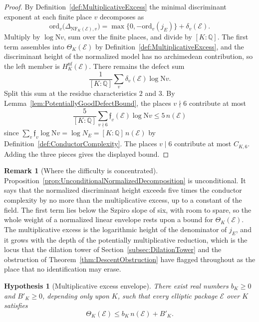 \documentclass[10pt, reqno]{amsart}
\theoremstyle{plain}
\theoremstyle{definition}
\newtheorem{remark}[theorem]{Remark}
\theoremstyle{plain}
\newtheorem{hypothesis}[theorem]{Hypothesis}
\newcommand{\Q}{\mathbb{Q}}
\begin{document}
\begin{proof}
By Definition~\ref{def:MultiplicativeExcess} the minimal discriminant exponent at each finite place $v$ decomposes as
\[
  \mathrm{ord}_{v}\bigl(\Delta_{\mathrm{NF}_{K}(\mathcal{E}),v}\bigr)
  =
  \max\bigl\{0,-\mathrm{ord}_{v}(j_{E})\bigr\}+\delta_{v}(\mathcal{E}).
\]
Multiply by $\log\mathrm{N}v$, sum over the finite places, and divide by $[K:\Q]$. The first term assembles into $\Theta_{K}(\mathcal{E})$ by Definition~\ref{def:MultiplicativeExcess}, and the discriminant height of the normalized model has no archimedean contribution, so the left member is $H^{\mathrm{nf}}_{K}(\mathcal{E})$. There remains the defect sum
\[
  \frac{1}{[K:\Q]}\sum_{v}\delta_{v}(\mathcal{E})\log\mathrm{N}v.
\]
Split this sum at the residue characteristics $2$ and $3$. By Lemma~\ref{lem:PotentiallyGoodDefectBound}, the places $v\nmid 6$ contribute at most
\[
  \frac{5}{[K:\Q]}\sum_{v\nmid 6}\mathfrak{f}_{v}(\mathcal{E})\log\mathrm{N}v
  \le
  5\,n(\mathcal{E})
\]
since $\sum_{v}\mathfrak{f}_{v}\log\mathrm{N}v=\log N_{E}=[K:\Q]\,n(\mathcal{E})$ by Definition~\ref{def:ConductorComplexity}. The places $v\mid 6$ contribute at most $C_{K,6}$. Adding the three pieces gives the displayed bound.
\end{proof}

\begin{remark}[Where the difficulty is concentrated]
\label{rem:LocalizationOfDifficulty}
Proposition~\ref{prop:UnconditionalNormalizedDecomposition} is unconditional. It says that the normalized discriminant height exceeds five times the conductor complexity by no more than the multiplicative excess, up to a constant of the field. The first term lies below the Szpiro slope of six, with room to spare, so the whole weight of a normalized linear envelope rests upon a bound for $\Theta_{K}(\mathcal{E})$. The multiplicative excess is the logarithmic height of the denominator of $j_{E}$, and it grows with the depth of the potentially multiplicative reduction, which is the locus that the dilation tower of Section~\ref{subsec:DilationTower} and the obstruction of Theorem~\ref{thm:DescentObstruction} have flagged throughout as the place that no identification may erase.
\end{remark}

\begin{hypothesis}[Multiplicative excess envelope]
\label{hyp:MultiplicativeExcessEnvelope}
There exist real numbers $b_{K}\ge 0$ and $B'_{K}\ge 0$, depending only upon $K$, such that every elliptic package $\mathcal{E}$ over $K$ satisfies
\[
  \Theta_{K}(\mathcal{E})\le b_{K}\,n(\mathcal{E})+B'_{K}.
\]
\end{hypothesis}
\end{document}
